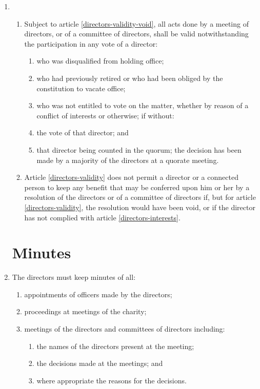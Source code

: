 \begin{enumerate}
\item
  \begin{enumerate}
  \item \label{directors-validity}
    Subject to article \ref{directors-validity-void}, all acts done by a meeting of directors,
    or of a committee of directors, shall be valid notwithstanding the
    participation in any vote of a director:
    \begin{enumerate}
    \item
      who was disqualified from holding office;
    \item
      who had previously retired or who had been obliged by the
      constitution to vacate office;
    \item
      who was not entitled to vote on the matter, whether by reason of a
      conflict of interests or otherwise; if without:
    \item
      the vote of that director; and
    \item
      that director being counted in the quorum; the decision has been
      made by a majority of the directors at a quorate meeting.
    \end{enumerate}
  \item \label{directors-validity-void}
    Article \ref{directors-validity} does not permit a director or a connected person to
    keep any benefit that may be conferred upon him or her by a
    resolution of the directors or of a committee of directors if, but
    for article \ref{directors-validity}, the resolution would have been void, or if the
    director has not complied with article \ref{directors-interests}.
  \end{enumerate}

\section{Minutes}

\item
The directors must keep minutes of all:
    \begin{enumerate}
        \item
            appointments of officers made by the directors;
        \item
            proceedings at meetings of the charity;
        \item
            meetings of the directors and committees of directors including:
            \begin{enumerate}
                \item
                    the names of the directors present at the meeting;
                \item
                    the decisions made at the meetings; and
                \item
                    where appropriate the reasons for the decisions.
            \end{enumerate}
    \end{enumerate}



\end{enumerate}
